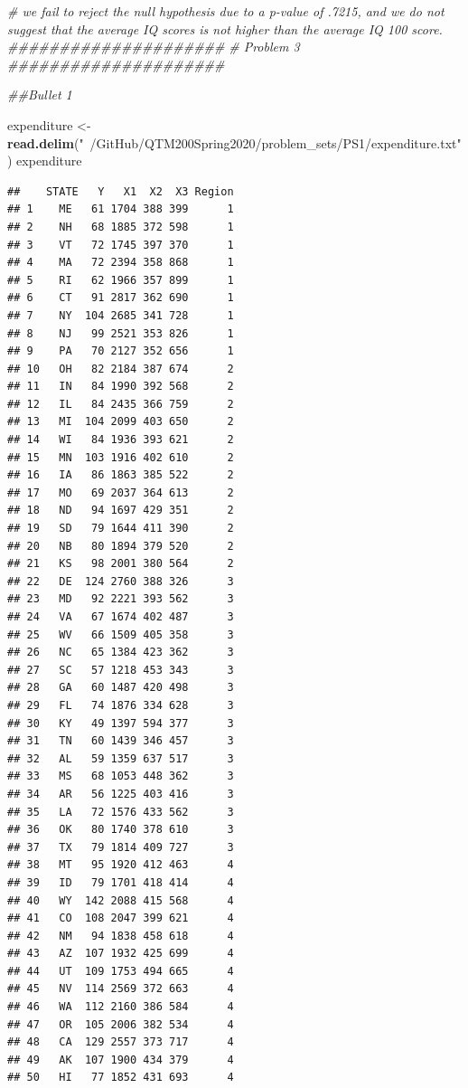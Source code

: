 \documentclass[]{article}
\newenvironment{Shaded}{\begin{snugshade}}{\end{snugshade}}
\newcommand{\CommentTok}[1]{\textcolor[rgb]{0.56,0.35,0.01}{\textit{#1}}}
\newcommand{\KeywordTok}[1]{\textcolor[rgb]{0.13,0.29,0.53}{\textbf{#1}}}
\newcommand{\NormalTok}[1]{#1}
\newcommand{\StringTok}[1]{\textcolor[rgb]{0.31,0.60,0.02}{#1}}
\begin{document}
\begin{Shaded}
\begin{Highlighting}[]
\CommentTok{# we fail to reject the null hypothesis due to a p-value of .7215, and we do not suggest that the average IQ scores is not higher  than the average IQ 100 score.  }
\CommentTok{#####################}
\CommentTok{# Problem 3}
\CommentTok{#####################}

\CommentTok{##Bullet 1}

\NormalTok{expenditure <-}\StringTok{ }\KeywordTok{read.delim}\NormalTok{(}\StringTok{"~/GitHub/QTM200Spring2020/problem_sets/PS1/expenditure.txt"}\NormalTok{)}
\NormalTok{expenditure}
\end{Highlighting}
\end{Shaded}

\begin{verbatim}
##    STATE   Y   X1  X2  X3 Region
## 1    ME   61 1704 388 399      1
## 2    NH   68 1885 372 598      1
## 3    VT   72 1745 397 370      1
## 4    MA   72 2394 358 868      1
## 5    RI   62 1966 357 899      1
## 6    CT   91 2817 362 690      1
## 7    NY  104 2685 341 728      1
## 8    NJ   99 2521 353 826      1
## 9    PA   70 2127 352 656      1
## 10   OH   82 2184 387 674      2
## 11   IN   84 1990 392 568      2
## 12   IL   84 2435 366 759      2
## 13   MI  104 2099 403 650      2
## 14   WI   84 1936 393 621      2
## 15   MN  103 1916 402 610      2
## 16   IA   86 1863 385 522      2
## 17   MO   69 2037 364 613      2
## 18   ND   94 1697 429 351      2
## 19   SD   79 1644 411 390      2
## 20   NB   80 1894 379 520      2
## 21   KS   98 2001 380 564      2
## 22   DE  124 2760 388 326      3
## 23   MD   92 2221 393 562      3
## 24   VA   67 1674 402 487      3
## 25   WV   66 1509 405 358      3
## 26   NC   65 1384 423 362      3
## 27   SC   57 1218 453 343      3
## 28   GA   60 1487 420 498      3
## 29   FL   74 1876 334 628      3
## 30   KY   49 1397 594 377      3
## 31   TN   60 1439 346 457      3
## 32   AL   59 1359 637 517      3
## 33   MS   68 1053 448 362      3
## 34   AR   56 1225 403 416      3
## 35   LA   72 1576 433 562      3
## 36   OK   80 1740 378 610      3
## 37   TX   79 1814 409 727      3
## 38   MT   95 1920 412 463      4
## 39   ID   79 1701 418 414      4
## 40   WY  142 2088 415 568      4
## 41   CO  108 2047 399 621      4
## 42   NM   94 1838 458 618      4
## 43   AZ  107 1932 425 699      4
## 44   UT  109 1753 494 665      4
## 45   NV  114 2569 372 663      4
## 46   WA  112 2160 386 584      4
## 47   OR  105 2006 382 534      4
## 48   CA  129 2557 373 717      4
## 49   AK  107 1900 434 379      4
## 50   HI   77 1852 431 693      4
\end{verbatim}
\end{document}
